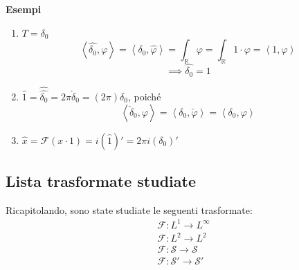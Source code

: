 \documentclass[a4paper]{article}
\newcommand{\R}{\mathbb{R}}
\begin{document}
\textbf{Esempi} 
\begin{enumerate}
	\item $T=\delta_0$ 
		\[\left< \hat{\delta_0},\varphi \right> =\left< \delta_0,\hat{\varphi} \right> = \int_{\R}^{} \varphi=\int_{\R}^{} 1\cdot \varphi=\left< 1,\varphi \right>  \]
		\[\implies \hat{\delta_0}=1\]
	\item $\hat{1}=\hat{\hat{\delta_0}}=2\pi\check\delta_0=(2\pi)\delta_0$, poiché
		\[\left<   \check\delta_0,\varphi \right>= \left< \delta_0,\check\varphi \right> =\left< \delta_0,\varphi \right> \]

	\item $\hat{x}=\mathcal F(x\cdot 1)=i(\hat{1})'=2\pi i(\delta_0)'$

\end{enumerate}
\subsection{Lista trasformate studiate}
Ricapitolando, sono state studiate le seguenti trasformate:
\begin{align*}
&\mathcal F: L^1\to L^\infty\\&\mathcal F: L^2\to L^2	
\\ &\mathcal F: \mathcal S\to \mathcal S
\\ &\mathcal F: \mathcal S'\to \mathcal S'
\end{align*}
\end{document}
